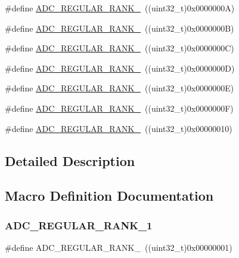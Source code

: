 \begin{DoxyCompactItemize}
\item 
\#define \mbox{\hyperlink{group___a_d_c__regular__rank_gad969d11913f157d860cc3e8ea81d2bcf}{A\+D\+C\+\_\+\+R\+E\+G\+U\+L\+A\+R\+\_\+\+R\+A\+N\+K\+\_}}~((uint32\+\_\+t)0x0000000\+A)
\item 
\#define \mbox{\hyperlink{group___a_d_c__regular__rank_gada79d07e1e30ef538ae3eb4d611d35a6}{A\+D\+C\+\_\+\+R\+E\+G\+U\+L\+A\+R\+\_\+\+R\+A\+N\+K\+\_}}~((uint32\+\_\+t)0x0000000\+B)
\item 
\#define \mbox{\hyperlink{group___a_d_c__regular__rank_ga038fc7ee28205a62242e105ac4004931}{A\+D\+C\+\_\+\+R\+E\+G\+U\+L\+A\+R\+\_\+\+R\+A\+N\+K\+\_}}~((uint32\+\_\+t)0x0000000\+C)
\item 
\#define \mbox{\hyperlink{group___a_d_c__regular__rank_gaf705597a827461af553a94766ca6e84b}{A\+D\+C\+\_\+\+R\+E\+G\+U\+L\+A\+R\+\_\+\+R\+A\+N\+K\+\_}}~((uint32\+\_\+t)0x0000000\+D)
\item 
\#define \mbox{\hyperlink{group___a_d_c__regular__rank_gab062685d9e3235869566d82891f5842b}{A\+D\+C\+\_\+\+R\+E\+G\+U\+L\+A\+R\+\_\+\+R\+A\+N\+K\+\_}}~((uint32\+\_\+t)0x0000000\+E)
\item 
\#define \mbox{\hyperlink{group___a_d_c__regular__rank_ga36d371d1ced7f233fdf59ffc67234b4d}{A\+D\+C\+\_\+\+R\+E\+G\+U\+L\+A\+R\+\_\+\+R\+A\+N\+K\+\_}}~((uint32\+\_\+t)0x0000000\+F)
\item 
\#define \mbox{\hyperlink{group___a_d_c__regular__rank_ga85f2ea453f67b9a5aad74aa94b696adb}{A\+D\+C\+\_\+\+R\+E\+G\+U\+L\+A\+R\+\_\+\+R\+A\+N\+K\+\_}}~((uint32\+\_\+t)0x00000010)
\end{DoxyCompactItemize}


\subsection{Detailed Description}


\subsection{Macro Definition Documentation}
\mbox{\label{group___a_d_c__regular__rank_gadf298d930c7a4f313ece62320dbd600c}} 
\subsubsection{\texorpdfstring{ADC\_REGULAR\_RANK\_1}{ADC\_REGULAR\_RANK\_1}}
{\footnotesize\ttfamily \#define A\+D\+C\+\_\+\+R\+E\+G\+U\+L\+A\+R\+\_\+\+R\+A\+N\+K\+\_~((uint32\+\_\+t)0x00000001)}

